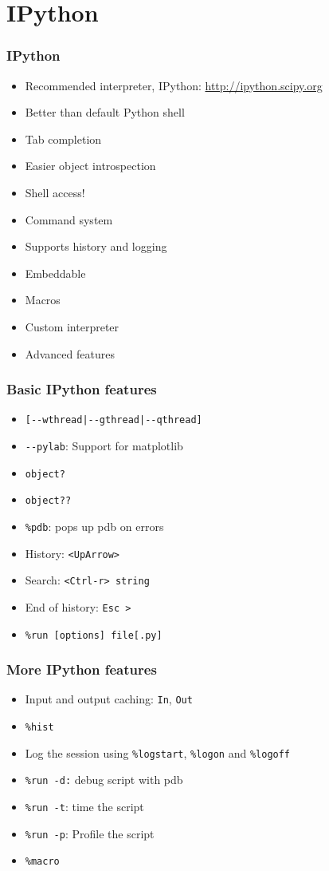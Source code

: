 \documentclass[14pt,compress]{beamer}
\newcounter{time}
\begin{document}
\section{IPython}

\begin{frame}
  \frametitle{IPython}
  \begin{itemize}
  \item Recommended interpreter, IPython:
    \url{http://ipython.scipy.org}
  \item Better than default Python shell
  \item Tab completion
  \item Easier object introspection
  \item Shell access!
  \item Command system
  \item Supports history and logging
  \item Embeddable
  \item Macros
  \item Custom interpreter
  \item Advanced features 
  \end{itemize}
\end{frame}

\begin{frame}[fragile]
  \frametitle{Basic IPython features}
  \begin{itemize}
  \item \verb+[--wthread|--gthread|--qthread]+
  \item \verb+--pylab+: Support for matplotlib
  \item \verb+object?+
  \item \verb+object??+
  \item \verb+%pdb+: pops up pdb on errors
  \item History: \texttt{<UpArrow>}
  \item Search: \texttt{<Ctrl-r> string}
  \item End of history: \texttt{Esc >}
  \item \verb+%run [options] file[.py]+
  \end{itemize}
\end{frame}

\begin{frame}[fragile]
  \frametitle{More IPython features}
  \begin{itemize}
  \item Input and output caching: \verb+In+, \verb+Out+
    \item \verb+%hist+ 
    \item Log the session using \verb+%logstart+, \verb+%logon+ and
    \verb+%logoff+
    \item \verb+%run -d:+ debug script with pdb
    \item \verb+%run -t+: time the script
    \item \verb+%run -p+: Profile the script
  \item \verb+%macro+ 
  \end{itemize}
\end{frame}
\end{document}
